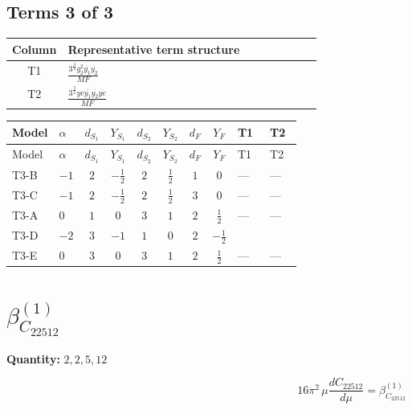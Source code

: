 \documentclass[8pt]{article}
\begin{document}
\begin{landscape}
\subsection*{Terms 3 of 3}
\begin{center}
\begin{tabular}{@{}c >{\raggedright\arraybackslash}p{0.82\linewidth}@{}}
\toprule
Column & Representative term structure \\
\midrule
T1 & \(\displaystyle \frac{3^{\frac{3}{4}} g_{2}^{2} \overline{y_{1}} \overline{y_{2}}}{MF}\) \\
\midrule
T2 & \(\displaystyle \frac{3^{\frac{3}{4}} ye \overline{y_{1}} \overline{y_{2}} \overline{ye}}{MF}\) \\
\midrule
\bottomrule
\end{tabular}
\end{center}
\smallskip
\tiny
\begin{longtable}{@{}llcccccc >{\raggedright\arraybackslash}p{0.21\linewidth} >{\raggedright\arraybackslash}p{0.21\linewidth}@{}}
\toprule
Model & $\alpha$ & $d_{S_1}$ & $Y_{S_1}$ & $d_{S_2}$ & $Y_{S_2}$ & $d_F$ & $Y_F$ & T1 & T2 \\
\midrule
\endfirsthead
\toprule
Model & $\alpha$ & $d_{S_1}$ & $Y_{S_1}$ & $d_{S_2}$ & $Y_{S_2}$ & $d_F$ & $Y_F$ & T1 & T2 \\
\midrule
\endhead
T3-B & $-1$ & $2$ & $-\frac{1}{2}$ & $2$ & $\frac{1}{2}$ & $1$ & $0$ & --- & --- \\
\midrule
T3-C & $-1$ & $2$ & $-\frac{1}{2}$ & $2$ & $\frac{1}{2}$ & $3$ & $0$ & --- & --- \\
\midrule
T3-A & $0$ & $1$ & $0$ & $3$ & $1$ & $2$ & $\frac{1}{2}$ & --- & --- \\
\midrule
T3-D & $-2$ & $3$ & $-1$ & $1$ & $0$ & $2$ & $-\frac{1}{2}$ & \scriptsize\adjustbox{max width=\linewidth}{$\begin{gathered} \frac{11 \cdot 3^{\frac{3}{4}} g_{2}^{2} \overline{y_{1}} \overline{y_{2}}}{8 MF}\end{gathered}$} & \scriptsize\adjustbox{max width=\linewidth}{$\begin{gathered} - \frac{3^{\frac{3}{4}} ye \overline{y_{1}} \overline{y_{2}} \overline{ye}}{12 MF}\end{gathered}$} \\
\midrule
T3-E & $0$ & $3$ & $0$ & $3$ & $1$ & $2$ & $\frac{1}{2}$ & --- & --- \\
\midrule
\bottomrule
\end{longtable}
\clearpage
\section*{$\beta_{C_{22512}}^{(1)}$}
\noindent\textbf{Quantity: }$\mathrm{2,2,5,12}$\par\smallskip
\[16\pi^2\,\mu\frac{d C_{22512}}{d\mu}=\beta_{C_{22512}}^{(1)}\]

\end{landscape}
\end{document}

